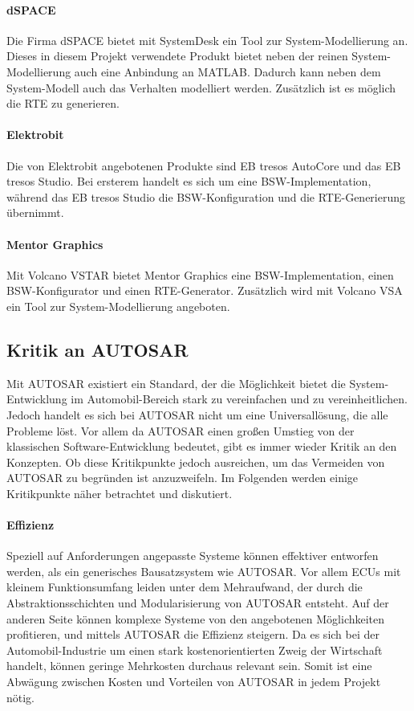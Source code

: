 \documentclass[
  a4paper,					    %
  twoside,
  DIV=calc,     				%
  bibliography=totoc,
  cleardoublepage=empty,
  ngerman,     					%
  final       					%
]{scrbook}
\begin{document}
\paragraph{dSPACE}
Die Firma dSPACE bietet mit SystemDesk ein Tool zur System-Modellierung an. Dieses in diesem Projekt verwendete Produkt bietet neben der reinen System-Modellierung auch eine Anbindung an MATLAB. Dadurch kann neben dem System-Modell auch das Verhalten modelliert werden. Zusätzlich ist es möglich die RTE zu generieren.

\paragraph{Elektrobit}
Die von Elektrobit angebotenen Produkte sind EB tresos AutoCore und das EB tresos Studio. Bei ersterem handelt es sich um eine BSW-Implementation, während das EB tresos Studio die BSW-Konfiguration und die RTE-Generierung übernimmt.

\paragraph{Mentor Graphics}
Mit Volcano VSTAR bietet Mentor Graphics eine BSW-Implementation, einen BSW-Konfigurator und einen RTE-Generator. Zusätzlich wird mit Volcano VSA ein Tool zur System-Modellierung angeboten.




\subsection{Kritik an AUTOSAR}
\label{sec:kritik_autosar}
Mit AUTOSAR existiert ein Standard, der die Möglichkeit bietet die System-Entwicklung im Automobil-Bereich stark zu vereinfachen und zu vereinheitlichen. Jedoch handelt es sich bei AUTOSAR nicht um eine Universallösung, die alle Probleme löst. Vor allem da AUTOSAR einen großen Umstieg von der klassischen Software-Entwicklung bedeutet, gibt es immer wieder Kritik an den Konzepten. Ob diese Kritikpunkte jedoch ausreichen, um das Vermeiden von AUTOSAR zu begründen ist anzuzweifeln. Im Folgenden werden einige Kritikpunkte näher betrachtet und diskutiert.

\paragraph{Effizienz}
Speziell auf Anforderungen angepasste Systeme können effektiver entworfen werden, als ein generisches Bausatzsystem wie AUTOSAR. Vor allem ECUs mit kleinem Funktionsumfang leiden unter dem Mehraufwand, der durch die Abstraktionsschichten und Modularisierung von AUTOSAR entsteht. Auf der anderen Seite können komplexe Systeme von den angebotenen Möglichkeiten profitieren, und mittels AUTOSAR die Effizienz steigern.\cite{as_kritik}\cite{wiki:autosar} Da es sich bei der Automobil-Industrie um einen stark kostenorientierten Zweig der Wirtschaft handelt, können geringe Mehrkosten durchaus relevant sein. Somit ist eine Abwägung zwischen Kosten und Vorteilen von AUTOSAR in jedem Projekt nötig.\cite[Seite 152]{SE_Autosar} 
\end{document}
